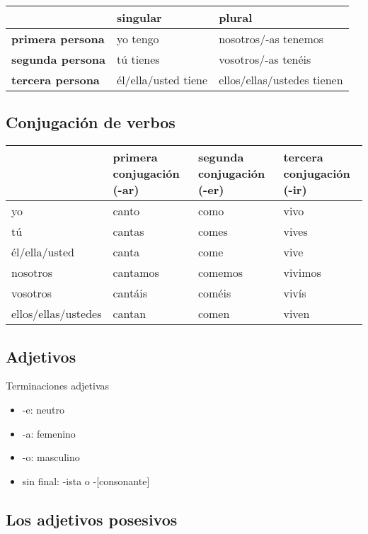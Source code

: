 \documentclass{article}
\begin{document}
	\begin{center}
		\begin{tabular}{l|l|l}
			& \textbf{singular} & \textbf{plural} \\
			\hline
			\textbf{primera persona} & yo tengo & nosotros/-as tenemos \\
			\hline
			\textbf{segunda persona} & tú tienes & vosotros/-as tenéis \\
			\hline
			\textbf{tercera persona} & él/ella/usted tiene &ellos/ellas/ustedes tienen
		\end{tabular}
	\end{center}
	
	\subsection{Conjugación de verbos}
	
	\begin{center}
		\begin{tabular}{l|lll}
			& \textbf{primera conjugación} (-ar) & \textbf{segunda conjugación} (-er) & \textbf{tercera conjugación} (-ir) \\
			\hline
			yo & canto & como & vivo \\
			tú & cantas & comes & vives \\
			él/ella/usted & canta & come & vive \\
			nosotros & cantamos & comemos & vivimos \\
			vosotros & cantáis & coméis & vivís \\
			ellos/ellas/ustedes & cantan & comen & viven
		\end{tabular}
	\end{center}
	
	\subsection{Adjetivos}
	Terminaciones adjetivas
	\begin{itemize}
		\item -e: neutro
		\item -a: femenino
		\item -o: masculino
		\item sin final: -ista o -[consonante]
	\end{itemize}
	
	\subsection{Los adjetivos posesivos}
	
\end{document}
